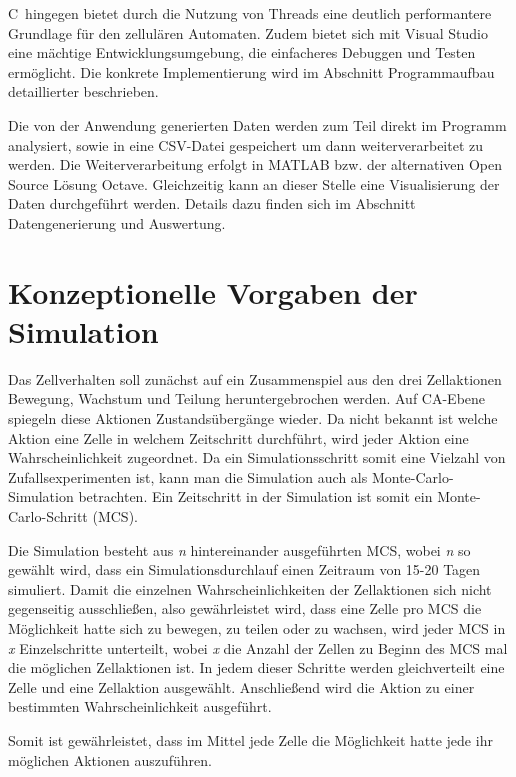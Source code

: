 \documentclass[11pt,a4paper,pointlessnumbers]{scrreprt}  %
\newcommand{\CS}{C\nolinebreak\hspace{-.05em}\raisebox{.6ex}{\scriptsize\bf \#}}
\begin{document}
\CS \ hingegen bietet durch die Nutzung von Threads eine deutlich performantere Grundlage für den zellulären Automaten. Zudem bietet sich mit Visual Studio eine mächtige Entwicklungsumgebung, die einfacheres Debuggen und Testen ermöglicht. Die konkrete Implementierung wird im Abschnitt Programmaufbau detaillierter beschrieben. \par 

Die von der Anwendung generierten Daten werden zum Teil direkt im Programm analysiert, sowie in eine CSV-Datei gespeichert um dann weiterverarbeitet zu werden. Die Weiterverarbeitung erfolgt in MATLAB bzw. der alternativen Open Source Lösung Octave. Gleichzeitig kann an dieser Stelle eine Visualisierung der Daten durchgeführt werden. Details dazu finden sich im Abschnitt Datengenerierung und Auswertung. 

\chapter{Konzeptionelle Vorgaben der Simulation}
Das Zellverhalten soll zunächst auf ein Zusammenspiel aus den drei Zellaktionen Bewegung, Wachstum und Teilung heruntergebrochen werden. Auf CA-Ebene spiegeln diese Aktionen Zustandsübergänge wieder. Da nicht bekannt ist welche Aktion eine Zelle in welchem Zeitschritt durchführt, wird jeder Aktion eine Wahrscheinlichkeit zugeordnet. Da ein Simulationsschritt somit eine Vielzahl von Zufallsexperimenten ist, kann man die Simulation auch als Monte-Carlo-Simulation betrachten. Ein Zeitschritt in der Simulation ist somit ein Monte-Carlo-Schritt (MCS). \par 

Die Simulation besteht aus \textit{n} hintereinander ausgeführten MCS, wobei \textit{n} so gewählt wird, dass ein Simulationsdurchlauf einen Zeitraum von 15-20 Tagen simuliert. Damit die einzelnen Wahrscheinlichkeiten der Zellaktionen sich nicht gegenseitig ausschließen, also gewährleistet wird, dass eine Zelle pro MCS die Möglichkeit hatte sich zu bewegen, zu teilen oder zu wachsen, wird jeder MCS in \textit{x} Einzelschritte unterteilt, wobei \textit{x} die Anzahl der Zellen zu Beginn des MCS mal die möglichen Zellaktionen ist. In jedem dieser Schritte werden gleichverteilt eine Zelle und eine Zellaktion ausgewählt. Anschließend wird die Aktion zu einer bestimmten Wahrscheinlichkeit ausgeführt. \par 

Somit ist gewährleistet, dass im Mittel jede Zelle die Möglichkeit hatte jede ihr möglichen Aktionen auszuführen. \par 
\end{document}
